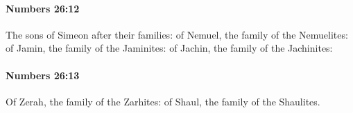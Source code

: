 		\paragraph{Numbers 26:12} %
			\label{NUMBERS-26-12}

			The sons of Simeon after their families: of Nemuel, the family of the Nemuelites: of Jamin, the family of the Jaminites: of Jachin, the family of the Jachinites:


		\paragraph{Numbers 26:13} %
			\label{NUMBERS-26-13}

			Of Zerah, the family of the Zarhites: of Shaul, the family of the Shaulites.


